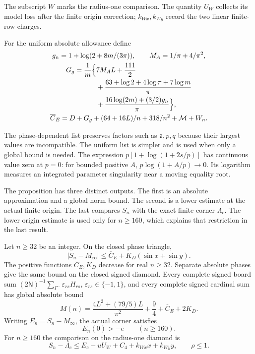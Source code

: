 The subscript $W$ marks the radius-one comparison. The quantity
$U_W$ collects its model loss after the finite origin correction;
$k_{Wx},k_{Wy}$ record the two linear finite-row charges.

For the uniform absolute allowance define
\begin{equation}\label{uc:uniform-allowance}
 \begin{gathered}
 g_n=1+\log(2+8m/(3\pi)),\qquad M_A=1/\pi+4/\pi^2,\\
 \begin{aligned}
 G_g=\frac1m\Bigl\{&7M_A L+\frac{111}2\\
 &+\frac{63+\log2+4\log\pi+7\log m}{\pi}\\
 &+\frac{16\log(2m)+(3/2)g_n}{\pi}\Bigr\},
 \end{aligned}\\
 \overline C_E=D+G_g+(64+16L)/n+318/n^2+\mathcal M+W_n.
 \end{gathered}
\end{equation}

The phase-dependent list preserves factors such as $\mathsf{a},p,q$ because
their largest values are incompatible. The uniform list is simpler
and is used when only a global bound is needed. The expression
$p[1+\log(1+2\overline s/p)]$ has continuous value zero at $p=0$:
for bounded positive $A$, $p\log(1+A/p)\to0$. Its logarithm measures
an integrated parameter singularity near a moving equality root.

The proposition has three distinct outputs. The first is an absolute
approximation and a global norm bound. The second is a lower estimate
at the actual finite origin. The last compares $S_n$ with the exact
finite corner $\Lambda_c$. The lower origin estimate is used only
for $n\geq160$, which explains that restriction in the last result.

\begin{theorem}\label{uc:finite-bounds}
Let $n\geq32$ be an integer. On the closed phase triangle,
\begin{equation}\label{uc:global-error}
 |S_n-M_\infty|\leq\overline C_E+K_D(\sin x+\sin y).
\end{equation}
The positive functions $\overline C_E,K_D$ decrease for real $n\geq32$.
Separate absolute phases give the same bound on the closed signed diamond.
Every complete signed board sum
$(2\mathsf N)^{-1}\sum_{\Gamma^-}\varepsilon_{rs}H_{rs}$,
$\varepsilon_{rs}\in\{-1,1\}$, and every complete signed cardinal sum
has global absolute bound
\begin{equation}\label{uc:analytic-norm}
 M(n)=\frac{4L^2+(79/5)L}{\pi^2}+\frac94+\overline C_E+2K_D.
\end{equation}
Writing $E_n=S_n-M_\infty$, the actual corner satisfies
\begin{equation}\label{uc:origin-lower}
 E_n(0)>-\bar e\qquad(n\geq160).
\end{equation}
For $n\geq160$ the comparison on the radius-one diamond is
\begin{equation}\label{uc:relative-comparison}
 S_n-\Lambda_c\leq E_c-uU_W+C_4+k_{Wx}x+k_{Wy}y,
 \qquad \rho\leq1.
\end{equation}
\end{theorem}

